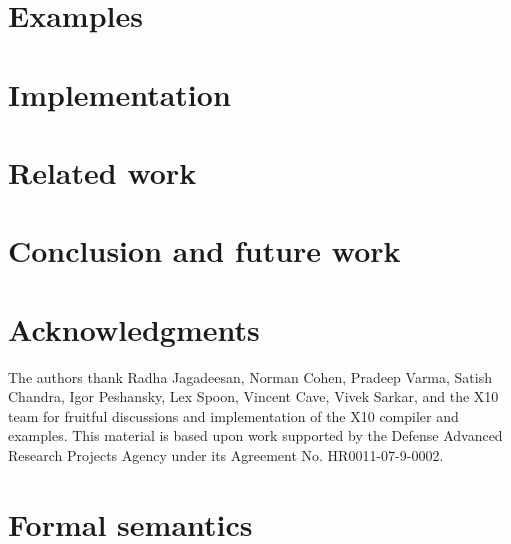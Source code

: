 \documentclass[10pt]{sigplanconf}
\begin{document}
\label{method-sec}


\section{Examples}\label{sec:examples}


\section{Implementation}\label{sec:implementation}
\label{sec:impl}


\section{Related work}\label{sec:related}


\section{Conclusion and future work}\label{sec:future}\label{sec:conclusions}
%

\fi

\section*{Acknowledgments}

The authors thank Radha Jagadeesan,
Norman Cohen, Pradeep Varma,
Satish Chandra, Igor Peshansky,
Lex Spoon, Vincent Cave, Vivek Sarkar,
and the X10 team for fruitful discussions and implementation of
the X10 compiler and examples.
This material is based upon work supported by the Defense
Advanced Research Projects Agency under its Agreement No.
HR0011-07-9-0002.
\fi





\appendix

\section{Formal semantics}
\label{sec:semantics}



% 
\end{document}
